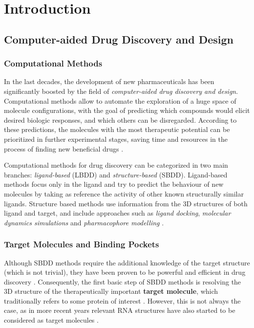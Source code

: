\chapter{Introduction} %

\section{Computer-aided Drug Discovery and Design}
  \subsection{Computational Methods}
    In the last decades, the development of new pharmaceuticals has been significantly boosted by the field of \textit{computer-aided drug discovery and design}. Computational methods allow to automate the exploration of a huge space of molecule configurations, with the goal of predicting which compounds would elicit desired biologic responses, and which others can be disregarded. According to these predictions, the molecules with the most therapeutic potential can be prioritized in further experimental stages, saving time and resources in the process of finding new beneficial drugs \cite{drug_discovery_2014}.

    Computational methods for drug discovery can be categorized in two main branches: \textit{ligand-based} (LBDD) and \textit{structure-based} (SBDD). Ligand-based methods focus only in the ligand and try to predict the behaviour of new molecules by taking as reference the activity of other known structurally similar ligands. Structure based methods use information from the 3D structures of both ligand and target, and include approaches such as \textit{ligand docking}, \textit{molecular dynamics simulations} and \textit{pharmacophore modelling} \cite{drug_discovery_2014, structure_based_2019}.

  \subsection{Target Molecules and Binding Pockets}
    Although SBDD methods require the additional knowledge of the target structure (which is not trivial), they have been proven to be powerful and efficient in drug discovery \cite{structure_based_2019}. Consequently, the first basic step of SBDD methods is resolving the 3D structure of the therapeutically important \textbf{target molecule}, which traditionally refers to some protein of interest \cite{structure_based_2019}. However, this is not always the case, as in more recent years relevant RNA structures have also started to be considered as target molecules \cite{rna_targets_2022}.

